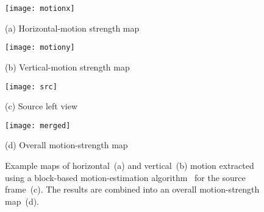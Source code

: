 \begin{figure}[!h]
	\begin{minipage}[b]{0.49\linewidth}
		\centering
		\centerline{ \texttt{[image: motionx]} }
		\centerline{\scriptsize{(a) Horizontal-motion strength map}}\medskip
	\end{minipage}%
	\hfill
	\begin{minipage}[b]{0.49\linewidth}
		\centering
		\centerline{\texttt{[image: motiony]} }
		\centerline{\scriptsize{(b) Vertical-motion strength map}}\medskip
	\end{minipage}
	\begin{minipage}[b]{0.49\linewidth}
		\centering
		\centerline{ \texttt{[image: src]} }
		\centerline{\scriptsize{(c) Source left view}}\medskip
	\end{minipage}%
	\hfill
	\begin{minipage}[b]{0.49\linewidth}
		\centering
		\centerline{\texttt{[image: merged]} }
		\centerline{\scriptsize{(d) Overall motion-strength map}}\medskip
	\end{minipage}
	\begin{minipage}[b]{\linewidth}
	\caption{Example maps of horizontal~(a) and vertical~(b) motion extracted
        using a block-based motion-estimation algorithm~\cite{simonyan2008fast} for the source frame~(c).
        The results  are combined into an overall motion-strength map~(d).}
    \label{fig:merged}
    \end{minipage}
\end{figure}
